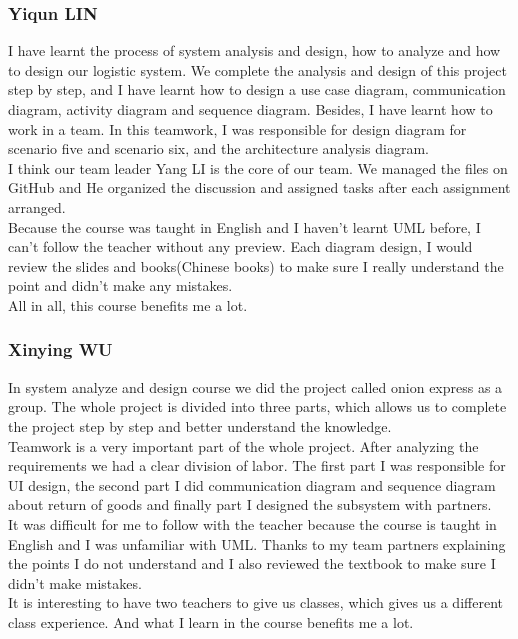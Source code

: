 \documentclass[12pt]{scrreprt}
\begin{document}
\subsubsection{Yiqun LIN}
I have learnt the process of system analysis and design, how to analyze and how to design our logistic system. We complete the analysis and design of this project step by step, and I have learnt how to design a use case diagram, communication diagram, activity diagram and sequence diagram. Besides, I have learnt how to work in a team. In this teamwork, I was responsible for design diagram for scenario five and scenario six, and the architecture analysis diagram. \\
I think our team leader Yang LI is the core of our team. We managed the files on GitHub and He organized the discussion and assigned tasks after each assignment arranged. \\
Because the course was taught in English and I haven't learnt UML before, I can't follow the teacher without any preview. Each diagram design, I would review the slides and books(Chinese books) to make sure I really understand the point and didn't make any mistakes.\\
All in all, this course benefits me a lot.\\

\subsubsection{Xinying WU}
In system analyze and design course we did the project called onion express as a group. The whole project is divided into three parts, which allows us to complete the project step by step and better understand the knowledge.\\
Teamwork is a very important part of the whole project. After analyzing the requirements we had a clear division of labor. The first part I was responsible for UI design, the second part I did communication diagram and sequence diagram about return of goods and finally part I designed the subsystem with partners.\\
It was difficult for me to follow with the teacher because the course is taught in English and I was unfamiliar with UML. Thanks to my team partners explaining the points I do not understand and I also reviewed the textbook to make sure I didn't make mistakes.\\
It is interesting to have two teachers to give us classes, which gives us a different class experience. And what I learn in the course benefits me a lot.
\end{document}
